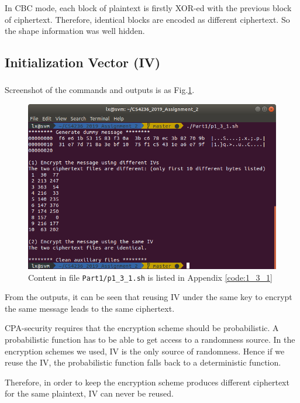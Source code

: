 In CBC mode, each block of plaintext is firstly XOR-ed with the previous block of ciphertext. Therefore, identical blocks are encoded as different ciphertext. So the shape information was well hidden. 

\subsection{Initialization Vector (IV)}

\subsubsection{}

Screenshot of the commands and outputs is as Fig.\ref{fig:p1_3_1}.

\begin{figure}[t!]
\centering
\includegraphics[width=\columnwidth]{pictures/p1_3_1.png}
\caption{
    Content in file \texttt{Part1/p1\_3\_1.sh} is listed in Appendix \ref{code:1_3_1}
}
\label{fig:p1_3_1}
\end{figure}

From the outputs, it can be seen that reusing IV under the same key to encrypt the same message leads to the same ciphertext.

CPA-security requires that the encryption scheme should be probabilistic. 
A probabilistic function has to be able to get access to a randomness source.
In the encryption schemes we used, IV is the only source of randomness.
Hence if we reuse the IV, the probabilistic function falls back to a deterministic function.

Therefore, in order to keep the encryption scheme produces different ciphertext for the same plaintext, IV can never be reused.

